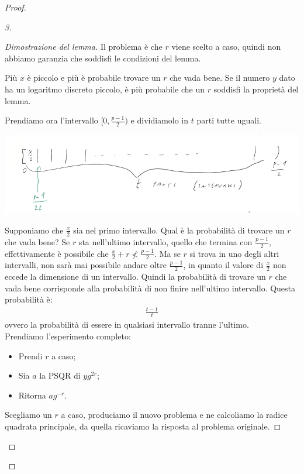 \begin{proof}
\begin{proof}[3]
\begin{proof}[Dimostrazione del lemma]
Il problema è che $r$ viene scelto a caso, quindi non abbiamo garanzia che soddisfi le condizioni del lemma. 

Più $x$ è piccolo e più è probabile trovare un $r$ che vada bene. Se il numero $y$ dato ha un logaritmo discreto piccolo, è più probabile che un $r$ soddisfi la proprietà del lemma.

Prendiamo ora l'intervallo $[0, \frac{p-1}{2})$ e dividiamolo in $t$ parti tutte uguali. 

\begin{center}
    \includegraphics[width=1\textwidth]{images/7.png}
\end{center}
\noindent Supponiamo che $\frac{x}{2}$ sia nel primo intervallo. Qual è la probabilità di trovare un $r$ che vada bene? Se $r$ sta nell'ultimo intervallo, quello che termina con $\frac{p-1}{2}$, effettivamente è possibile che $\frac{x}{2} + r \not< \frac{p-1}{2}$. Ma se $r$ si trova in uno degli altri intervalli, non sarà mai possibile andare oltre $\frac{p-1}{2}$, in quanto il valore di $\frac{x}{2}$ non eccede la dimensione di un intervallo. Quindi la probabilità di trovare un $r$ che vada bene corrisponde alla probabilità di non finire nell'ultimo intervallo. Questa probabilità è:
\begin{align*}
    \frac{t-1}{t}
\end{align*}
\noindent ovvero la probabilità di essere in qualsiasi intervallo tranne l'ultimo. \\

\noindent Prendiamo l'esperimento completo:
\begin{itemize}
    \item Prendi $r$ a caso;
    \item Sia $a$ la PSQR di $yg^{2r}$;
    \item Ritorna $ag^{-r}$.
\end{itemize}
\noindent Scegliamo un $r$ a caso, produciamo il nuovo problema e ne calcoliamo la radice quadrata principale, da quella ricaviamo la risposta al problema originale. 


\end{proof}
\end{proof}
\end{proof}
